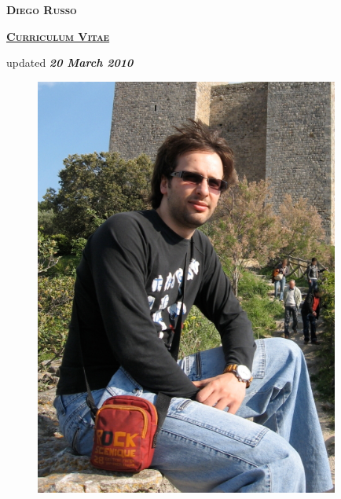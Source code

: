 \documentclass[totpages,helvetica,openbib,english]{europecv}
\begin{document}
    \begin{center}
        \hspace{1pt}
        \vspace{2cm}
    
        {\scshape \textbf{\Huge Diego Russo}}
    
        \vspace{1cm}
    
        {\scshape \textbf{\large \underline{Curriculum Vitae}}}
    
        \vspace{0.25cm}
    
        updated \emph{\textbf{20 March 2010}}
        
        \vspace{2cm}
        
        \begin{figure}[htbp] 
            \begin{center} 
                \includegraphics[width=10cm]{io.jpg}
            \end{center} 
        \end{figure}
        
    \end{center}
\pagebreak
{}
\end{document}
